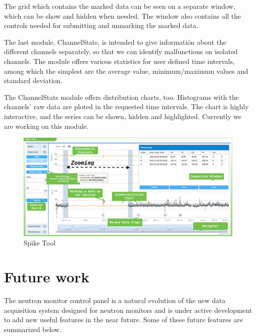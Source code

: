 \documentclass[a4paper]{jpconf}
\begin{document}
The grid which contains the marked data can be seen on a separate window, which
can be show and hidden when needed. The window also contains all the
controls needed for submitting and unmarking the marked data.

The last module, ChannelStats, is intended to give informatión about the
different channels separately, so that we can identify malfunctions on isolated
channels. The module offers various statistics for user defined time intervals,
among which the simplest are the average value, minimum/maximum
values and standard deviation.

The ChannelStats module offers distribution charts, too. Histograms with the
channels' raw data are ploted in the requested time intervals. The chart is
highly interactive, and the series can be shown, hidden and highlighted. Currently
we are working on this module.

\begin{figure}[h]
    \centering
    \includegraphics[keepaspectratio, width=1\textwidth]{./resources/SpikeTool.png}
    \caption{Spike Tool}
    \label{fig:arch}
\end{figure}

\section{Future work}

The neutron monitor control panel is a natural evolution of the new data
acquisition system designed for neutron monitors and is under active
development to add new useful features in the near future. Some of these future
features are summarized below.
\end{document}
